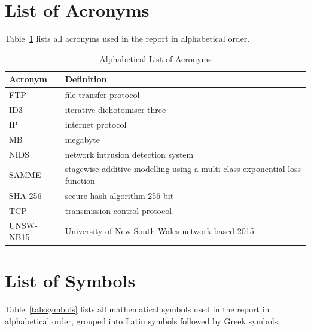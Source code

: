 \appendices

\section{List of Acronyms}
\label{app:acronyms}

Table~\ref{tab:acronyms} lists all acronyms used in the report in alphabetical order.

\begin{table}[!h]
\centering
\caption{Alphabetical List of Acronyms}
\label{tab:acronyms}
\footnotesize
\setlength{\tabcolsep}{4pt}
\begin{tabular}{lp{6.2cm}}
\toprule
\textbf{Acronym} & \textbf{Definition} \\
\midrule
FTP       & file transfer protocol \\
ID3       & iterative dichotomiser three \\
IP        & internet protocol \\
MB        & megabyte \\
NIDS      & network intrusion detection system \\
SAMME     & stagewise additive modelling using a multi-class exponential loss function \\
SHA-256   & secure hash algorithm 256-bit \\
TCP       & transmission control protocol \\
UNSW-NB15 & University of New South Wales network-based 2015 \\
\bottomrule
\end{tabular}
\end{table}

\onecolumn
\section{List of Symbols}
\label{app:symbols}

Table~\ref{tab:symbols} lists all mathematical symbols used in the report in alphabetical order, grouped into Latin symbols followed by Greek symbols.

